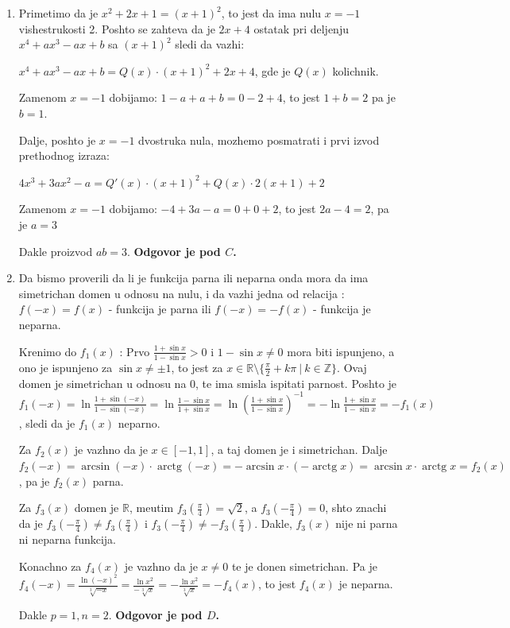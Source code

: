 \documentclass[a4paper,12pt]{article}
\renewcommand{\arctg}{\operatorname{arctg}}
\begin{document}
\begin{enumerate}[1.]
\item Primetimo da je $x^2 +2x+1 = (x+1)^2$, to jest da ima nulu $x =-1$ vishestrukosti 2. Poshto se zahteva da je $2x+4$ ostatak pri deljenju $x^4 + ax^3 -ax +b $ sa $(x+1)^2$ sledi da vazhi:
\par  $x^4 + ax^3 -ax +b  = Q(x) \cdot (x+1)^2 + 2x+4$, gde je $Q(x)$ kolichnik.
\par Zamenom $x=-1$ dobijamo: $1-a+a+b = 0 -2 +4 $, to jest $ 1+b = 2$ pa je $b = 1$.
\par Dalje, poshto je $x=-1$ dvostruka nula, mozhemo posmatrati i prvi izvod prethodnog izraza:
\par $4x^3 + 3ax^2 -a = Q'(x) \cdot (x+1)^2 + Q(x) \cdot 2(x+1) + 2$
\par Zamenom $x=-1$ dobijamo: $-4 + 3a -a = 0+0+2$, to jest $2a-4 = 2$, pa je $a = 3$
\par Dakle proizvod $ab =3 $. \textbf{Odgovor je pod $C$.}

\item Da bismo proverili da li je funkcija parna ili neparna onda mora da ima simetrichan domen u odnosu na nulu, i da vazhi jedna od relacija : $f(-x) = f(x) $ - funkcija je parna ili $f(-x) = -f(x) $ - funkcija je neparna.
\par Krenimo do $f_1(x)$ : Prvo $\frac{1 + \sin{x}}{1 - \sin{x}} > 0$ i $1 - \sin{x} \neq 0$ mora biti ispunjeno, a ono je ispunjeno za $\sin{x} \neq \pm 1$, to jest za $x \in \mathbb{R}\setminus\{\frac{\pi}{2}+k\pi\ |\ k\in\mathbb{Z}\}$. Ovaj domen je simetrichan u odnosu na 0, te ima smisla ispitati parnost. Poshto je $f_1(-x) = \ln \frac{1 + \sin(-x)}{1 - \sin(-x)} =\ln \frac{1 - \sin{x}}{1 + \sin{x}} =   \ln \left(\frac{1 + \sin{x}}{1 - \sin{x}}\right)^{-1} =-\ln\frac{1 + \sin{x}}{1 - \sin{x}}=-f_1(x) $, sledi da je $f_1(x)$ neparno.
\par Za $f_2(x)$ je vazhno da je $x \in [-1,1]$, a taj domen je i simetrichan. Dalje $ f_2(-x) = \arcsin(-x) \cdot \arctg(-x) = -  \arcsin{x} \cdot ( - \arctg{x} ) =  \arcsin{x} \cdot \arctg{x}  = f_2(x)$, pa je $f_2(x)$ parna.
\par Za $f_3(x) $ domen je $\mathbb{R}$, me\dj{}utim $f_3 \left(\frac{\pi}{4}\right) = \sqrt{2}$, a $f_3 \left(- \frac{\pi}{4}\right) = 0$, shto znachi da je $f_3 \left(-\frac{\pi}{4}\right) \neq f_3 \left(\frac{\pi}{4}\right)$ i $f_3 \left(-\frac{\pi}{4}\right)\neq-f_3 \left(\frac{\pi}{4}\right)$. Dakle, $f_3(x)$ nije ni parna ni neparna funkcija.
\par Konachno za $f_4(x)$ je vazhno da je $x\neq 0$ te je donen simetrichan. Pa je $f_4(-x) = \frac{\ln{(-x)^2}}{\sqrt[3]{-x}} = \frac{\ln{x^2}}{-\sqrt[3]{x}} = - \frac{\ln{x^2}}{\sqrt[3]{x}} = - f_4(x)$, to jest $f_4(x)$ je neparna. 
\par Dakle $p = 1,n=2$.  \textbf{Odgovor je pod $D$.}


\end{enumerate}
\end{document}
